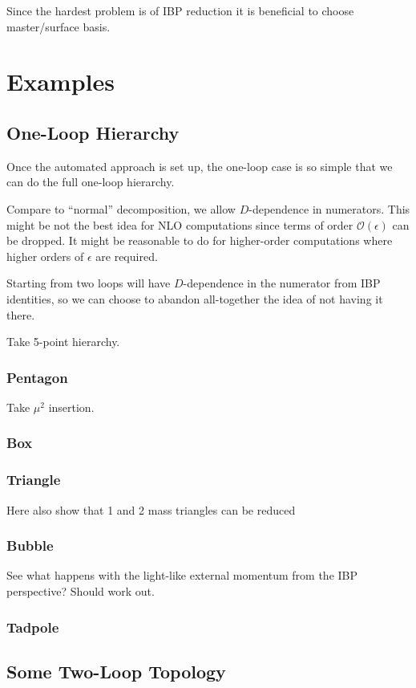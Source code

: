 Since the hardest problem is of IBP reduction it is beneficial to choose master/surface basis.

\section{Examples}

\subsection{One-Loop Hierarchy}

Once the automated approach is set up, the one-loop case is so simple that we can
do the full one-loop hierarchy.

Compare to ``normal'' decomposition, we allow $D$-dependence in numerators. This might be not the best
idea for NLO computations since terms of order $\mathcal{O}(\epsilon)$ can be dropped.
It might be reasonable to do for higher-order computations where higher orders of $\epsilon$ are required.

Starting from two loops will have $D$-dependence in the numerator from IBP identities, so
we can choose to abandon all-together the idea of not having it there.


Take 5-point hierarchy.

\subsubsection{Pentagon}

Take $\mu^2$ insertion.

\subsubsection{Box}

\subsubsection{Triangle}

Here also show that 1 and 2 mass triangles can be reduced

\subsubsection{Bubble}

See what happens with the light-like external momentum from the IBP perspective?
Should work out.

\subsubsection{Tadpole}

\subsection{Some Two-Loop Topology}


